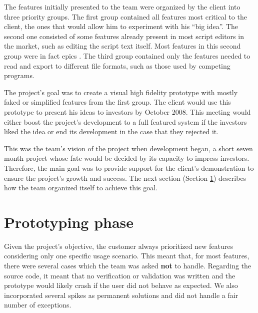\documentclass[lnbip]{svmultln}
\begin{document}

The features initially presented to the team were organized by the
client into three priority groups. The first group contained all
features most critical to the client, the ones that would allow him to
experiment with his ``big idea''. The second one consisted of some
features already present in most script editors in the market, such as
editing the script text itself. Most features in this second group
were in fact epics \cite{Cohn2004}. The third group contained only the
features needed to read and export to different file formats, such as
those used by competing programs.

The project's goal was to create a visual high fidelity prototype with
mostly faked or simplified features from the first group. The client
would use this prototype to present his ideas to investors by October
2008. This meeting would either boost the project's development to a
full featured system if the investors liked the idea or end its
development in the case that they rejected it.

This was the team's vision of the project when development began, a
short seven month project whose fate would be decided by its capacity
to impress investors. Therefore, the main goal was to provide support
for the client's demonstration to ensure the project's growth and
success. The next section (Section \ref{sec:working}) describes how
the team organized itself to achieve this goal.

\section{Prototyping phase}
\label{sec:working}

Given the project's objective, the customer always prioritized new
features considering only one specific usage scenario. This meant
that, for most features, there were several cases which the team was
asked \textbf{not} to handle. Regarding the source code, it meant that
no verification or validation was written and the prototype would
likely crash if the user did not behave as expected. We also
incorporated several spikes as permanent solutions and did not handle
a fair number of exceptions.
\end{document}
